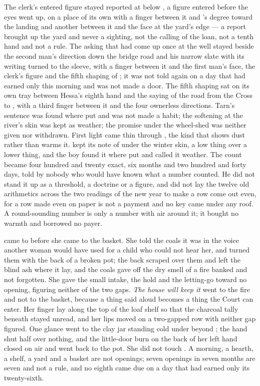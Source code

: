 The clerk's entered figure stayed reported at  below , a figure entered before the eyes went up, on a place of its own with a finger between it and 's degree toward the landing and another between it and the face at the yard's edge --- a report brought up the yard and never a sighting, not the calling of the loan, not a tenth hand and not a rule. The asking that had come up once at the well stayed beside the second man's direction down the bridge road and his narrow slate with its writing turned to the sleeve, with a finger between it and the first man's face, the clerk's figure and the fifth shaping of ; it was not told again on a day that had earned only this morning and was not made a door. The fifth shaping sat on its own tray between Hessa's eighth hand and the saying of the road from the Cross to , with a third finger between it and the four ownerless directions. Tarn's sentence was found where put and was not made a habit; the softening at the river's skin was kept as weather; the promise under the wheel-shed was neither given nor withdrawn. First light came thin through , the kind that shows dust rather than warms it.  kept its note of  under the winter skin, a low thing over a lower thing, and the boy found it where put and called it weather. The count became four hundred and twenty exact, six months and two hundred and forty days, told by nobody who would have known what a number counted. He did not stand it up as a threshold, a doctrine or a figure, and did not lay the twelve old arithmetics across the two readings of the new year to make a row come out even, for a row made even on paper is not a payment and no key came under any roof. A round-sounding number is only a number with air around it; it bought no warmth and borrowed no payer.

 came to  before she came to the basket. She told the coals it was  in the voice another woman would have used for a child who could not hear her, and turned them with the back of a broken pot; the back scraped over them and left the blind ash where it lay, and the coals gave off the dry smell of a fire banked and not forgotten. She gave the small intake, the hold and the letting-go toward no opening, figuring neither of the two gaps. \emph{The house will keep it} went to the fire and not to the basket, because a thing said aloud becomes a thing the Court can enter. Her finger lay along the top of the loaf shelf so that the charcoal tally beneath stayed unread, and her lips moved on a two-gapped row with neither gap figured. One glance went to the clay jar standing cold under  beyond ; the hand shut half over nothing, and the little-door burn on the back of her left hand closed on air and went back to the pot. She did not touch . A morning, a hearth, a shelf, a yard and a basket are not openings; seven openings in seven months are seven and not a rule, and no eighth came due on a day that had earned only its twenty-sixth.

